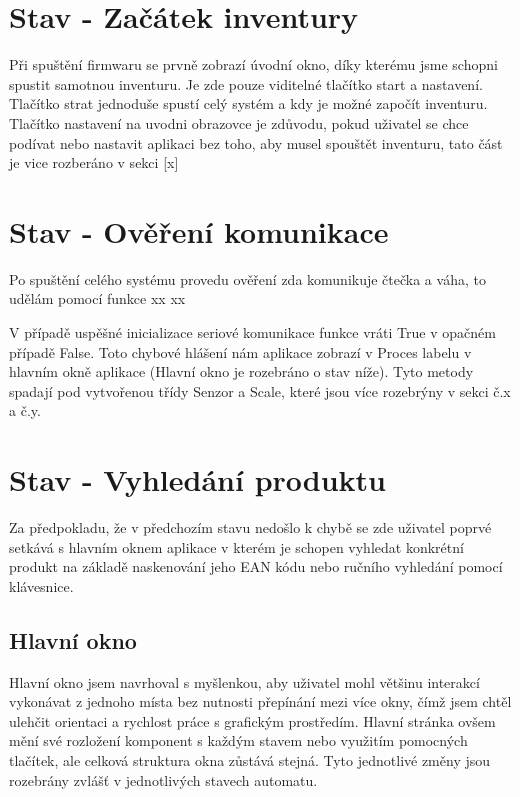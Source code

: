 \section{Stav - Začátek inventury}
Při spuštění firmwaru se prvně zobrazí úvodní okno, díky kterému jsme schopni spustit samotnou inventuru. Je zde pouze viditelné tlačítko start a nastavení. Tlačítko strat jednoduše spustí celý systém a kdy je možné započít inventuru. Tlačítko nastavení na uvodni obrazovce je zdůvodu, pokud uživatel se chce podívat nebo nastavit aplikaci bez toho, aby musel spouštět inventuru, tato část je vice rozberáno v sekci [x]



\section{Stav - Ověření komunikace}
Po spuštění celého systému provedu ověření zda komunikuje čtečka a váha, to udělám pomocí funkce 
xx 
xx 

V případě uspěšné inicializace seriové komunikace funkce vráti True v opačném případě False. Toto chybové hlášení nám aplikace zobrazí v Proces labelu v hlavním okně aplikace (Hlavní okno je rozebráno o stav níže). Tyto metody spadají pod vytvořenou třídy Senzor a Scale, které jsou více rozebrýny v sekci č.x a č.y. 

\section{Stav - Vyhledání produktu}

Za předpokladu, že v předchozím stavu nedošlo k chybě se zde uživatel poprvé setkává s hlavním oknem aplikace v kterém je schopen vyhledat konkrétní produkt na základě naskenování jeho EAN kódu nebo ručního vyhledání pomocí klávesnice.

\subsection{Hlavní okno}
Hlavní okno jsem navrhoval s myšlenkou, aby uživatel mohl většinu interakcí vykonávat z jednoho místa bez nutnosti přepínání mezi více okny, čímž jsem chtěl ulehčit orientaci a rychlost práce s grafickým prostředím. Hlavní stránka ovšem mění své rozložení komponent s každým stavem nebo využitím pomocných tlačítek, ale celková struktura okna zůstává stejná. Tyto jednotlivé změny jsou rozebrány zvlášť v jednotlivých stavech automatu.


